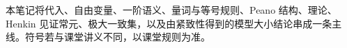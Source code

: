 \documentclass[cjk]{loom}
\begin{document}
\begin{strand}
本笔记将代入、自由变量、一阶语义、量词与等号规则、Peano 结构、理论、Henkin 见证常元、极大一致集，以及由紧致性得到的模型大小结论串成一条主线。符号若与课堂讲义不同，以课堂规则为准。
\end{strand}
\clearpage
\tableofcontents
\clearpage





\end{document}
